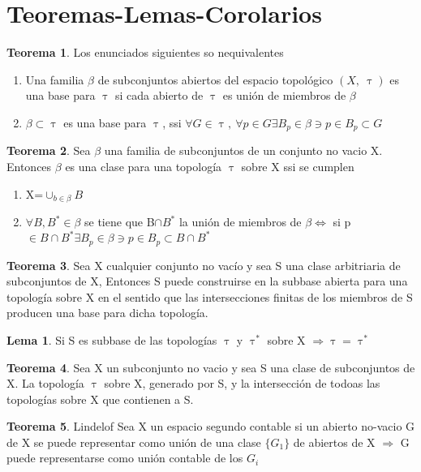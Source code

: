 \documentclass{article}
\theoremstyle{definition}
\newtheorem{theorem}{Teorema}
\newtheorem{lemma}{Lema}
\begin{document}
\section{Teoremas-Lemas-Corolarios}
\begin{theorem}
	Los enunciados siguientes so nequivalentes
	\begin{enumerate}
		\item Una familia $\beta$ de subconjuntos abiertos del espacio topológico $(X,\ \uptau)$ es una base para $\uptau$ si cada abierto de $\uptau$ es unión de miembros de $\beta$
		\item $\beta\subset\uptau$ es una base para $\uptau$, ssi $\forall G\in \uptau,\ \forall p\in G \exists B_p\in\beta\ni p\in B_p\subset G$ 
	\end{enumerate}
\end{theorem}
\begin{theorem}
	 Sea $\beta$ una familia de subconjuntos de un conjunto no vacio X. Entonces $\beta$ es una clase para una topología $\uptau$ sobre X ssi se cumplen 
	 \begin{enumerate}
	 \item X=$\cup_{b\in\beta} B$
	 \item $\forall B, B^*\in\beta$ se tiene que B$\cap B^*$ la unión de miembros de $\beta \Leftrightarrow$ si p$\in B\cap B^*\exists B_p\in\beta\ni p\in B_p\subset B\cap B^*$ 
	 \end{enumerate}
\end{theorem}
\begin{theorem}
	Sea X cualquier conjunto no vacío y sea S una clase arbitriaria de subconjuntos de X, Entonces S puede construirse en la subbase abierta para una topología sobre X en el sentido que las intersecciones finitas de los miembros de S producen una base para dicha topología.
\end{theorem}
\begin{lemma}
Si S es subbase de las topologías $\uptau$ y $\uptau^*$  sobre X $\Rightarrow\uptau = \uptau^*$
\end{lemma}
\begin{theorem}
Sea X un subconjunto no vacio y sea S una clase de subconjuntos de X. La topología $\uptau$ sobre X, generado por S, y la intersección de todoas las topologías sobre X que contienen a S. 
\end{theorem}
\begin{theorem}{Lindelof}
	Sea X un espacio segundo contable si un abierto no-vacio G de X se puede representar como unión de una clase $\{G_1\}$ de abiertos de X $\Rightarrow$ G puede representarse como unión contable de los $G_i$
\end{theorem}
\end{document}
